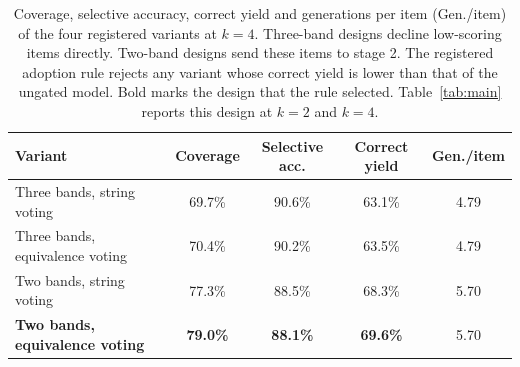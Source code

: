 \begin{table}[t]
\small\setlength{\tabcolsep}{3pt}
\caption{Coverage, selective accuracy, correct yield and generations per item (Gen./item) of the four registered variants at $k=4$. Three-band designs decline low-scoring items directly. Two-band designs send these items to stage 2. The registered adoption rule rejects any variant whose correct yield is lower than that of the ungated model. Bold marks the design that the rule selected. Table~\ref{tab:main} reports this design at $k=2$ and $k=4$.\label{tab:variants}}
\begin{tabularx}{\textwidth}{lCCCC}
\toprule
\textbf{Variant} & \textbf{Coverage} & \textbf{Selective acc.} & \textbf{Correct yield} & \textbf{Gen./item} \\
\midrule
Three bands, string voting & 69.7\% & 90.6\% & 63.1\% & 4.79 \\
Three bands, equivalence voting & 70.4\% & 90.2\% & 63.5\% & 4.79 \\
Two bands, string voting & 77.3\% & 88.5\% & 68.3\% & 5.70 \\
\textbf{Two bands, equivalence voting} & \textbf{79.0\%} & \textbf{88.1\%} & \textbf{69.6\%} & 5.70 \\
\bottomrule
\end{tabularx}
\end{table}
